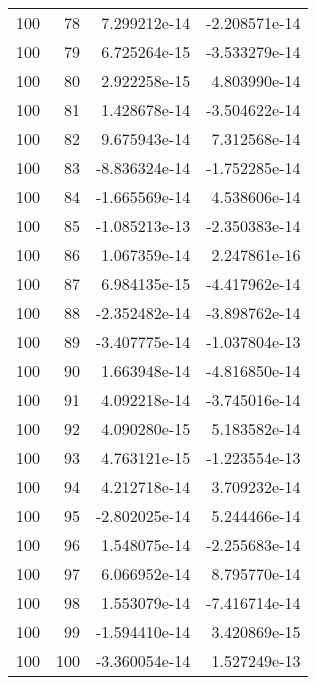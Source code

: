 \begin{tabular}{rrrr}
 100 &   78 &  7.299212e-14 & -2.208571e-14 \\
 100 &   79 &  6.725264e-15 & -3.533279e-14 \\
 100 &   80 &  2.922258e-15 &  4.803990e-14 \\
 100 &   81 &  1.428678e-14 & -3.504622e-14 \\
 100 &   82 &  9.675943e-14 &  7.312568e-14 \\
 100 &   83 & -8.836324e-14 & -1.752285e-14 \\
 100 &   84 & -1.665569e-14 &  4.538606e-14 \\
 100 &   85 & -1.085213e-13 & -2.350383e-14 \\
 100 &   86 &  1.067359e-14 &  2.247861e-16 \\
 100 &   87 &  6.984135e-15 & -4.417962e-14 \\
 100 &   88 & -2.352482e-14 & -3.898762e-14 \\
 100 &   89 & -3.407775e-14 & -1.037804e-13 \\
 100 &   90 &  1.663948e-14 & -4.816850e-14 \\
 100 &   91 &  4.092218e-14 & -3.745016e-14 \\
 100 &   92 &  4.090280e-15 &  5.183582e-14 \\
 100 &   93 &  4.763121e-15 & -1.223554e-13 \\
 100 &   94 &  4.212718e-14 &  3.709232e-14 \\
 100 &   95 & -2.802025e-14 &  5.244466e-14 \\
 100 &   96 &  1.548075e-14 & -2.255683e-14 \\
 100 &   97 &  6.066952e-14 &  8.795770e-14 \\
 100 &   98 &  1.553079e-14 & -7.416714e-14 \\
 100 &   99 & -1.594410e-14 &  3.420869e-15 \\
 100 &  100 & -3.360054e-14 &  1.527249e-13 \\
\bottomrule
\end{tabular}
